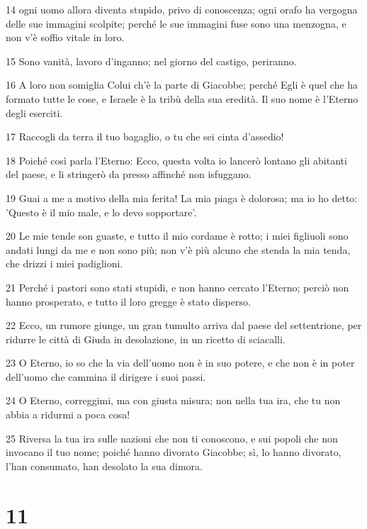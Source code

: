 \par 14 ogni uomo allora diventa stupido, privo di conoscenza; ogni orafo ha vergogna delle sue immagini scolpite; perché le sue immagini fuse sono una menzogna, e non v'è soffio vitale in loro.
\par 15 Sono vanità, lavoro d'inganno; nel giorno del castigo, periranno.
\par 16 A loro non somiglia Colui ch'è la parte di Giacobbe; perché Egli è quel che ha formato tutte le cose, e Israele è la tribù della sua eredità. Il suo nome è l'Eterno degli eserciti.
\par 17 Raccogli da terra il tuo bagaglio, o tu che sei cinta d'assedio!
\par 18 Poiché così parla l'Eterno: Ecco, questa volta io lancerò lontano gli abitanti del paese, e li stringerò da presso affinché non isfuggano.
\par 19 Guai a me a motivo della mia ferita! La mia piaga è dolorosa; ma io ho detto: 'Questo è il mio male, e lo devo sopportare'.
\par 20 Le mie tende son guaste, e tutto il mio cordame è rotto; i miei figliuoli sono andati lungi da me e non sono più; non v'è più alcuno che stenda la mia tenda, che drizzi i miei padiglioni.
\par 21 Perché i pastori sono stati stupidi, e non hanno cercato l'Eterno; perciò non hanno prosperato, e tutto il loro gregge è stato disperso.
\par 22 Ecco, un rumore giunge, un gran tumulto arriva dal paese del settentrione, per ridurre le città di Giuda in desolazione, in un ricetto di sciacalli.
\par 23 O Eterno, io so che la via dell'uomo non è in suo potere, e che non è in poter dell'uomo che cammina il dirigere i suoi passi.
\par 24 O Eterno, correggimi, ma con giusta misura; non nella tua ira, che tu non abbia a ridurmi a poca cosa!
\par 25 Riversa la tua ira sulle nazioni che non ti conoscono, e sui popoli che non invocano il tuo nome; poiché hanno divorato Giacobbe; sì, lo hanno divorato, l'han consumato, han desolato la sua dimora.

\chapter{11}

